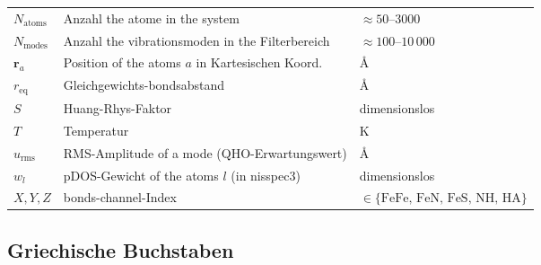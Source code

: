 \documentclass[11pt,a4paper,twoside]{article}
\providecommand{\angstrom}{\text{\AA}}    %
\theoremstyle{remark}
\begin{document}
\begin{tabular}{p{1.5cm} p{6cm} p{4cm}}
  $N_\text{atoms}$ & Anzahl the atome in the system & $\approx 50$--$3000$ \\
  $N_\text{modes}$ & Anzahl the vibrationsmoden in the Filterbereich & $\approx 100$--$10\,000$ \\
  $\mathbf{r}_a$  & Position of the atoms $a$ in Kartesischen Koord. & $\angstrom$ \\
  $r_\text{eq}$   & Gleichgewichts-bondsabstand & $\angstrom$ \\
  $S$             & Huang-Rhys-Faktor & dimensionslos \\
  $T$             & Temperatur & K \\
  $u_\text{rms}$  & RMS-Amplitude of a mode (QHO-Erwartungswert) & $\angstrom$ \\
  $w_l$           & pDOS-Gewicht of the atoms $l$ (in nisspec3) & dimensionslos \\
  $X, Y, Z$       & bonds-channel-Index & $\in \{\text{FeFe, FeN, FeS, NH, HA}\}$ \\
  \bottomrule
\end{tabular}

\subsection{Griechische Buchstaben}
\end{document}
